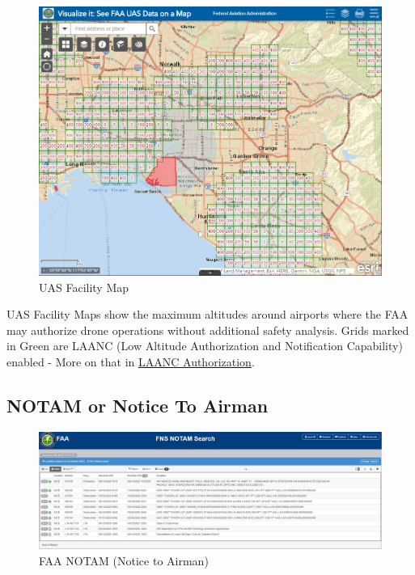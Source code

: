 \documentclass[
]{book}
\begin{document}
\begin{figure}

{\centering \includegraphics[width=0.9\linewidth]{images/facility-map} 

}

\caption{UAS Facility Map}\label{fig:facility-map}
\end{figure}

UAS Facility Maps show the maximum altitudes around airports where the FAA may authorize drone operations without additional safety analysis. Grids marked in Green are LAANC (Low Altitude Authorization and Notification Capability) enabled - More on that in \protect\hyperlink{ch-LAANC}{LAANC Authorization}.

\hypertarget{notam-or-notice-to-airman}{%
\subsection{NOTAM or Notice To Airman}\label{notam-or-notice-to-airman}}

\begin{figure}
\centering
\includegraphics{images/FAA-Notam.png}
\caption{FAA NOTAM (Notice to Airman)}
\end{figure}
\end{document}

